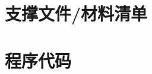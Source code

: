 \documentclass[12pt]{article}
\begin{document}
\appendix
\section{支撑文件/材料清单}

%
\section{程序代码}
% 
\end{document}
